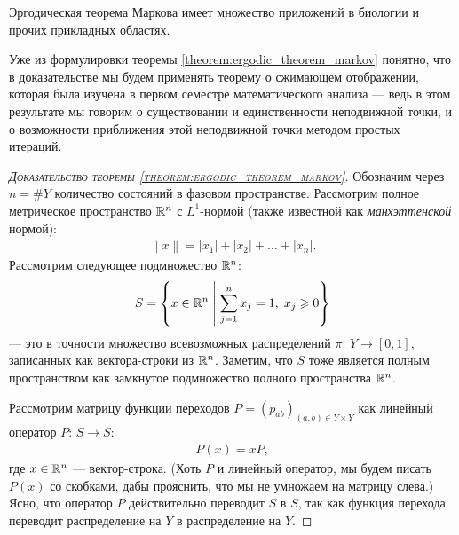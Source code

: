 \documentclass[../main.tex]{subfiles}
\begin{document}
Эргодическая теорема Маркова имеет множество приложений в биологии и прочих прикладных областях.

Уже из формулировки теоремы \ref{theorem:ergodic_theorem_markov} понятно, что в доказательстве мы будем применять теорему о сжимающем отображении, которая была изучена в первом семестре математического анализа --- ведь в этом результате мы говорим о существовании и единственности неподвижной точки, и о возможности приближения этой неподвижной точки методом простых итераций.

\begin{proof}[\normalfont\textsc{Доказательство теоремы \ref{theorem:ergodic_theorem_markov}}]
 Обозначим через $n = \# Y $ количество состояний в фазовом пространстве. Рассмотрим полное метрическое пространство $ \mathbb{R}^{n} $ с $ L^{1} $-нормой (также известной как \textit{манхэттенской} нормой):
 \begin{align*}
  \left\| x \right\| = \left| x_1 \right| + \left| x_2 \right| + \ldots + \left| x_n \right|.
 \end{align*} Рассмотрим следующее подмножество $ \mathbb{R}^{n} $:
 \begin{align*}
  S = \left\{ x \in \mathbb{R}^{n} \;\middle|\; \sum_{j=1}^{n}x_j = 1,\; x_j \geqslant 0 \right\}
 \end{align*} --- это в точности множество всевозможных распределений $ \pi \colon\,Y \to [0,1] $, записанных как вектора-строки из $ \mathbb{R}^{n} $. Заметим, что $ S $ тоже является полным пространством как замкнутое подмножество полного пространства $ \mathbb{R}^{n} $.

 Рассмотрим матрицу функции переходов $ P = \left( p_{ab} \right)_{(a,b) \in Y \times Y} $ как линейный оператор $ P \colon\,S \to S $:
 \begin{align*}
  P(x) = x P,
 \end{align*} где $ x \in \mathbb{R}^{n} $ --- вектор-строка. (Хоть $ P $ и линейный оператор, мы будем писать $ P(x) $ со скобками, дабы прояснить, что мы не умножаем на матрицу слева.) Ясно, что оператор $ P $ действительно переводит $ S $ в $ S $, так как функция перехода переводит распределение на $ Y $ в распределение на $ Y $.


\end{proof}
\end{document}
